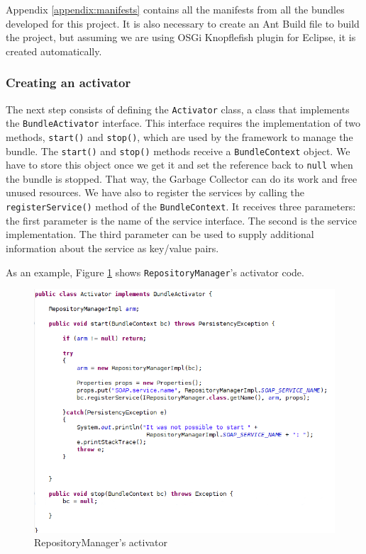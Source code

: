 Appendix \ref{appendix:manifests} contains all the manifests from all the
bundles developed for this project.
\newline
It is also necessary to create an Ant Build file to build the project, but
assuming we are using OSGi Knopflefish plugin for Eclipse, it is created
automatically.

\subsubsection{Creating an activator}

The next step consists of defining the \verb|Activator| class, a class that
implements the \verb|BundleActivator| interface. This interface requires the
implementation of two methods, \verb|start()| and \verb|stop()|, which are used
by the framework to manage the bundle.
The \verb|start()| and \verb|stop()| methods receive a \verb|BundleContext|
object. We have to store this object once we get it and set the reference back
to \verb|null| when the bundle is stopped. That way, the Garbage Collector can
do its work and free unused resources.
\newline
We have also to register the services by calling the \verb|registerService()|
method of the \verb|BundleContext|. It receives three parameters: the first
parameter is the name of the service interface. The second is the service 
implementation. The third parameter can be used to supply additional 
information about the service as key/value pairs.

As an example, Figure \ref{img:repository-activator} shows
\verb|RepositoryManager|'s activator code.

\begin{figure}[h!]
 \begin{center}

 \includegraphics[scale=0.65]{screenshots/repository-activator.png}
  \caption{\label{img:repository-activator}RepositoryManager's activator}
 \end{center}
\end{figure}


